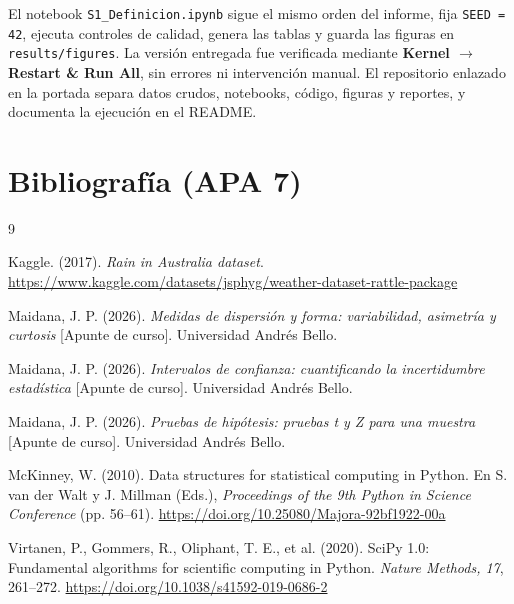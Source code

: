 \documentclass[11pt,a4paper]{article}
\begin{document}
El notebook \texttt{S1\_Definicion.ipynb} sigue el mismo orden del informe, fija \texttt{SEED = 42}, ejecuta controles de calidad, genera las tablas y guarda las figuras en \texttt{results/figures}. La versión entregada fue verificada mediante \textbf{Kernel $\rightarrow$ Restart \& Run All}, sin errores ni intervención manual. El repositorio enlazado en la portada separa datos crudos, notebooks, código, figuras y reportes, y documenta la ejecución en el README.

\clearpage
\section{Bibliografía (APA 7)}

\begin{thebibliography}{9}
\small

Kaggle. (2017). \textit{Rain in Australia dataset}.
\url{https://www.kaggle.com/datasets/jsphyg/weather-dataset-rattle-package}

Maidana, J. P. (2026). \textit{Medidas de dispersión y forma: variabilidad, asimetría y curtosis} [Apunte de curso]. Universidad Andrés Bello.

Maidana, J. P. (2026). \textit{Intervalos de confianza: cuantificando la incertidumbre estadística} [Apunte de curso]. Universidad Andrés Bello.

Maidana, J. P. (2026). \textit{Pruebas de hipótesis: pruebas t y Z para una muestra} [Apunte de curso]. Universidad Andrés Bello.

McKinney, W. (2010). Data structures for statistical computing in Python. En S. van der Walt y J. Millman (Eds.), \textit{Proceedings of the 9th Python in Science Conference} (pp. 56--61). \url{https://doi.org/10.25080/Majora-92bf1922-00a}

Virtanen, P., Gommers, R., Oliphant, T. E., et al. (2020). SciPy 1.0: Fundamental algorithms for scientific computing in Python. \textit{Nature Methods, 17}, 261--272. \url{https://doi.org/10.1038/s41592-019-0686-2}

\end{thebibliography}
\end{document}
